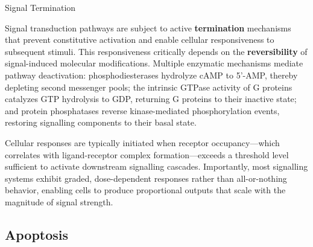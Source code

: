 \documentclass[10pt]{article}
\begin{document}
    \begin{core}{Signal Termination}

      Signal transduction pathways are subject to active \textbf{termination} mechanisms that prevent constitutive activation and enable cellular responsiveness to subsequent stimuli. This responsiveness critically depends on the \textbf{reversibility} of signal-induced molecular modifications. Multiple enzymatic mechanisms mediate pathway deactivation: phosphodiesterases hydrolyze cAMP to 5'-AMP, thereby depleting second messenger pools; the intrinsic GTPase activity of G proteins catalyzes GTP hydrolysis to GDP, returning G proteins to their inactive state; and protein phosphatases reverse kinase-mediated phosphorylation events, restoring signalling components to their basal state.

    \end{core}  

    Cellular responses are typically initiated when receptor occupancy---which correlates with ligand-receptor complex formation---exceeds a threshold level sufficient to activate downstream signalling cascades. Importantly, most signalling systems exhibit graded, dose-dependent responses rather than all-or-nothing behavior, enabling cells to produce proportional outputs that scale with the magnitude of signal strength.

  \subsection{Apoptosis}
\end{document}
